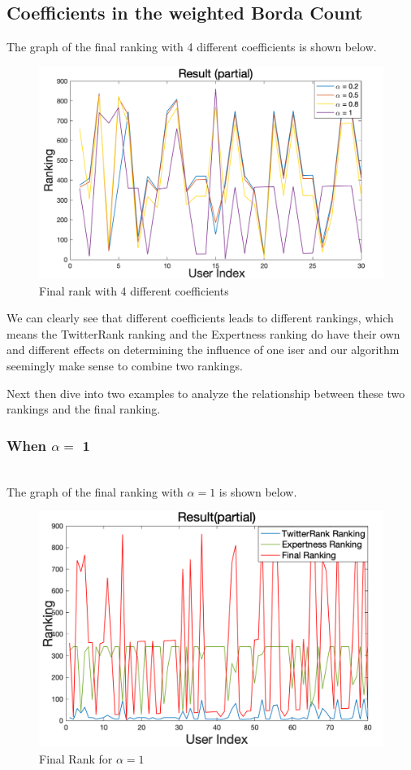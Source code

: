 \documentclass[conference]{IEEEtran}
\theoremstyle{definition}
\begin{document}
\subsection{Coefficients in the weighted Borda Count}
The graph of the final ranking with 4 different coefficients is shown below.

\begin{figure}[htb]  
	\centering                       
	\includegraphics[width=0.8\linewidth]{3.png}
	\caption{Final rank with 4 different coefficients }
	\label{dif-co}
\end{figure} 

We can clearly see that different coefficients leads to different rankings, which means the TwitterRank ranking and the Expertness ranking do have their own and different effects on determining the influence of one iser and our algorithm seemingly make sense to combine two rankings.\par
Next then dive into two examples to analyze the relationship between these two rankings and the final ranking.\\

\subsubsection{When $\alpha = $ 1}~\\
\indent The graph of the final ranking with $\alpha = 1$ is shown below.

\begin{figure}[htb]  
	\centering                       
	\includegraphics[width=0.8\linewidth]{4.png}
	\caption{Final Rank for $\alpha = 1$}
	\label{co10}
\end{figure} 
\end{document}
